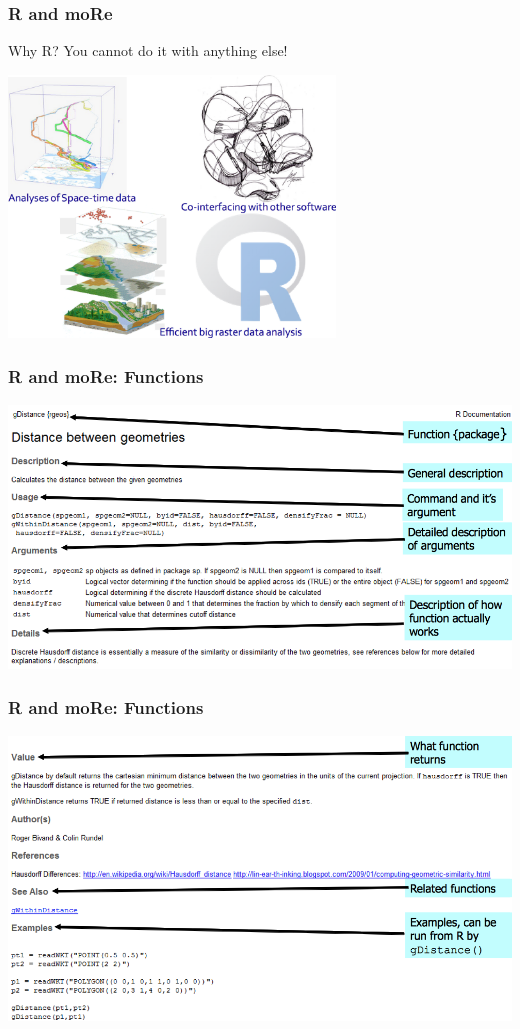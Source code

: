 \documentclass{beamer}
\begin{document}

\begin{frame}
\frametitle{R and moRe}
\begin{block}{Why R?}
You cannot do it with anything else!
\end{block}
\pause
\centering
\includegraphics[width=0.65\textwidth]{Figures/R_adv.png}
\end{frame}


\begin{frame}
\frametitle{R and moRe: Functions}
\centering
\includegraphics[width=\textwidth]{Figures/Rbasic1.png}
\end{frame}


\begin{frame}
\frametitle{R and moRe: Functions}
\centering
\includegraphics[width=\textwidth]{Figures/Rbasic2.png}
\end{frame}
\end{document}
